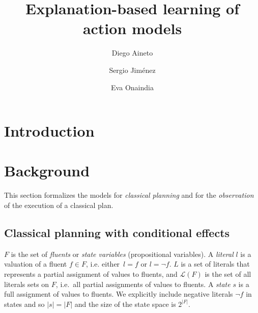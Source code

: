 \documentclass[runningheads]{llncs}
\begin{document}
%
\title{Explanation-based learning of action models}
%
%
\author{Diego Aineto\orcidID{} \and
Sergio Jiménez \and
Eva Onaindia}
%
%
%
\maketitle              %
%
\begin{abstract}

\end{abstract}



\section{Introduction}

\section{Background}
This section formalizes the models for {\em classical planning} and for the {\em observation} of the execution of a classical plan.

\subsection{Classical planning with conditional effects}
$F$ is the set of {\em fluents} or {\em state variables} (propositional variables). A {\em literal} $l$ is a valuation of a fluent $f\in F$, i.e. either~$l=f$ or $l=\neg f$. $L$ is a set of literals that represents a partial assignment of values to fluents, and $\mathcal{L}(F)$ is the set of all literals sets on $F$, i.e.~all partial assignments of values to fluents. A {\em state} $s$ is a full assignment of values to fluents. We explicitly include negative literals $\neg f$ in states and so $|s|=|F|$ and the size of the state space is $2^{|F|}$.
\end{document}
